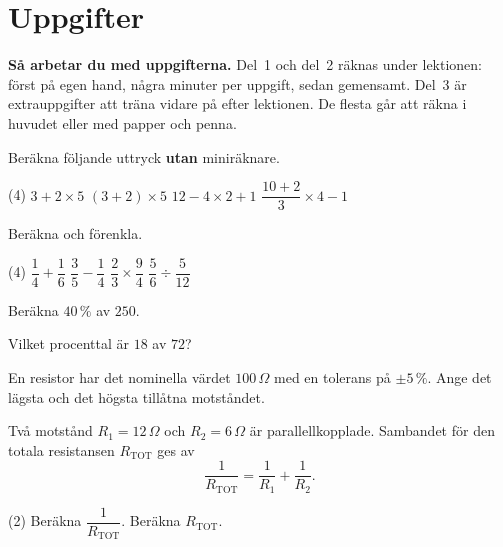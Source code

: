 
\section{Uppgifter}
\label{c1:sec:uppgifter}

\begin{aside}
\textbf{Så arbetar du med uppgifterna.} Del~1 och del~2 räknas under lektionen: först på egen
hand, några minuter per uppgift, sedan gemensamt. Del~3 är extrauppgifter att träna vidare på
efter lektionen. De flesta går att räkna i huvudet eller med papper och penna.

\end{aside}


Beräkna följande uttryck \textbf{utan} miniräknare.
\begin{delar}(4)
  \task $3 + 2 \times 5$
  \task $(3 + 2) \times 5$
  \task $12 - 4 \times 2 + 1$
  \task $\dfrac{10 + 2}{3} \times 4 - 1$
\end{delar}

Beräkna och förenkla.
\begin{delar}(4)
  \task $\dfrac{1}{4} + \dfrac{1}{6}$
  \task $\dfrac{3}{5} - \dfrac{1}{4}$
  \task $\dfrac{2}{3} \times \dfrac{9}{4}$
  \task $\dfrac{5}{6} \div \dfrac{5}{12}$
\end{delar}

\begin{parts}
  \item Beräkna $40\,\%$ av $250$.
  \item Vilket procenttal är $18$ av $72$?
  \item En resistor har det nominella värdet $100\,\Omega$ med en tolerans på $\pm 5\,\%$. Ange det
    lägsta och det högsta tillåtna motståndet.
\end{parts}


Två motstånd $R_1 = 12\,\Omega$ och $R_2 = 6\,\Omega$ är parallellkopplade. Sambandet för den
totala resistansen $R_{\text{TOT}}$ ges av
\[
  \frac{1}{R_{\text{TOT}}} = \frac{1}{R_1} + \frac{1}{R_2}.
\]
\begin{delar}(2)
  \task Beräkna $\dfrac{1}{R_{\text{TOT}}}$.
  \task Beräkna $R_{\text{TOT}}$.
\end{delar}

